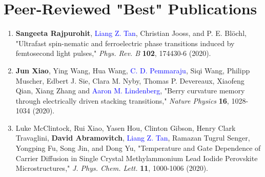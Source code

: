 \section{Peer-Reviewed "Best" Publications}

\begin{enumerate}
    \item  {\bf Sangeeta Rajpurohit}, \textcolor{blue}{Liang Z. Tan},  Christian Jooss, and P. E. Bl\"ochl, "Ultrafast spin-nematic and ferroelectric phase transitions induced by femtosecond light pulses," {\it Phys. Rev. B} {\bf 102}, 174430-6 (2020). 

    
    \item {\bf Jun Xiao}, Ying Wang, Hua Wang, \textcolor{blue}{C. D. Pemmaraju}, Siqi Wang, Philipp Muscher, Edbert J. Sie, Clara M. Nyby, Thomas P. Devereaux, Xiaofeng Qian, Xiang Zhang and \textcolor{blue}{Aaron M. Lindenberg}, "Berry curvature memory through electrically driven stacking transitions," {\it Nature Physics} {\bf 16}, 1028-1034 (2020).

    \item  Luke McClintock, Rui Xiao, Yasen Hou, Clinton Gibson, Henry Clark Travaglini, {\bf David Abramovitch}, \textcolor{blue}{Liang Z. Tan}, Ramazan Tugrul Senger, Yongping Fu, Song Jin, and Dong Yu, "Temperature and Gate Dependence of Carrier Diffusion in Single Crystal Methylammonium Lead Iodide Perovskite Microstructures," {\it J. Phys. Chem. Lett.} {\bf 11}, 1000-1006 (2020). 
    
\end{enumerate}

\label{sec:appendix3}

\clearpage
